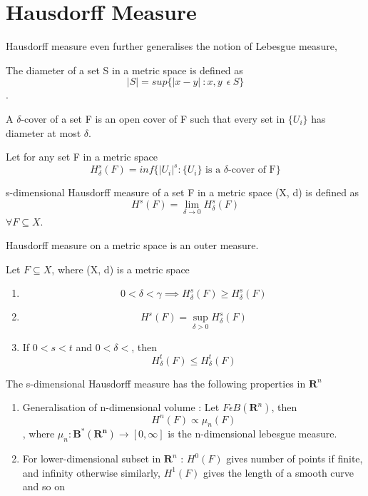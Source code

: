 \section{Hausdorff Measure}
Hausdorff measure even further generalises the notion of Lebesgue measure,
\begin{definition}
    The diameter of a set S in a metric space is defined as
    \[
        |S| = sup\{|x-y| \: : x,y \:  \: \epsilon \: S \}
    \]
    .
\end{definition}
\begin{definition}
    A $\delta$-cover of a set F is an open cover of F such that every set in
    $\{U_i\}$ has diameter at most $\delta$.
\end{definition}
Let for any set F in a metric space
\[
    H_\delta^s(F) = inf\{|U_i|^s : \{U_i\} \text{ is a $\delta$-cover of F} \}
\]
\begin{definition}
    s-dimensional Hausdorff measure of a set F in a metric space (X, d) is 
    defined as
    \[
        H^s(F) = \lim_{\delta \to 0} H_\delta^s(F)
    \]
    $\forall F \subseteq X$.
\end{definition}
\begin{theorem}
    Hausdorff measure on a metric space is an outer measure.
\end{theorem}
\begin{theorem}\label{thm_haus_mea_lim}
    Let $F \subseteq X$, where (X, d) is a metric space
    \begin{enumerate}
        \item \[
                0 < \delta < \gamma \implies H_\delta^s (F) \geqslant
                H_\delta^s (F) 
            \]
        \item \[
                H^s (F) = \sup_{\delta > 0} H_\delta^s(F)
            \]
        \item If $0 < s < t$ and $0 < \delta < $, then
            \[
                H_\delta^t(F) \leqslant H_\delta^t(F)
            \]
    \end{enumerate}
\end{theorem}
\begin{theorem}
    The s-dimensional Hausdorff measure has the following properties in
    $\bm{R}^n$
    \begin{enumerate}
        \item Generalisation of n-dimensional volume : Let $F \epsilon
            B(\bm{R}^n)$, then
            \[
                H^n(F) \propto \mu_n(F)
            \]
            , where $\mu_n : \bm{B^*(R^n)} \to [0, \infty]$ is the n-dimensional lebesgue
            measure.
        \item For lower-dimensional subset in $\bm{R}^n$ : $H^0(F)$ gives number
            of points if finite, and infinity otherwise
            \newline similarly, $H^1(F)$ gives the length of a smooth curve
            \newline and so on
    \end{enumerate}
\end{theorem}

